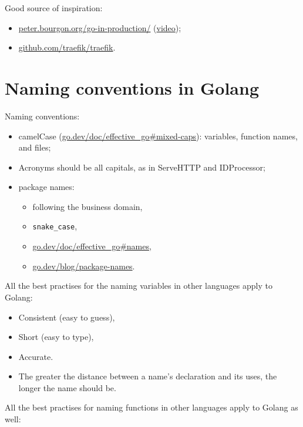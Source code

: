 \documentclass[11pt, letterpaper]{article}
\begin{document}
Good source of inspiration:

\begin{itemize}%
\item \href{https://peter.bourgon.org/go-in-production/}{peter.bourgon.org/go-in-production/} (\href{https://www.youtube.com/watch?v=PTE4VJIdHPg}{video});
\item \href{https://github.com/traefik/traefik}{github.com/traefik/traefik}.
\end{itemize}%

\section{Naming conventions in Golang}

Naming conventions:

\begin{itemize}%
\item camelCase (\href{https://go.dev/doc/effective\_go\#mixed-caps}{go.dev/doc/effective\_go\#mixed-caps}): variables, function names, and files;
\item Acronyms should be all capitals, as in ServeHTTP and IDProcessor;
\item package names: \begin{itemize}%
\item following the business domain,
\item \verb|snake_case|,
\item \href{https://go.dev/doc/effective\_go\#names}{go.dev/doc/effective\_go\#names},
\item \href{https://go.dev/blog/package-names}{go.dev/blog/package-names}.
\end{itemize}%
\end{itemize}%

All the best practises for the naming variables in other languages apply to Golang:

\begin{itemize}%
\item Consistent (easy to guess),
\item Short (easy to type),
\item Accurate.
\item The greater the distance between a name's declaration and its uses, 
the longer the name should be.
\end{itemize}%

All the best practises for naming functions in other languages apply to Golang as well:
\end{document}
